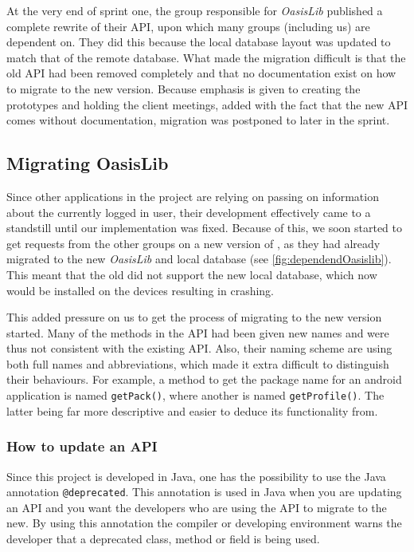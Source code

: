 At the very end of sprint one, the group responsible for \textit{OasisLib} published a complete rewrite of their API, upon which many groups (including us) are dependent on.
They did this because the local database layout was updated to match that of the remote database.
What made the migration difficult is that the old API had been removed completely and that no documentation exist on how to migrate to the new version.
Because emphasis is given to creating the prototypes and holding the client meetings, added with the fact that the new API comes without documentation, migration was postponed to later in the sprint.

\subsection{Migrating OasisLib}\label{sec:oasismigration}

Since other applications in the \giraf project are relying on \launcher passing on information about the currently logged in user, their development effectively came to a standstill until our implementation was fixed.
Because of this, we soon started to get requests from the other groups on a new version of \launcher, as they had already migrated to the new \textit{OasisLib} and local database (see \cref{fig:dependendOasislib}).
This meant that the old \launcher did not support the new local database, which now would be installed on the devices resulting in \launcher crashing.


This added pressure on us to get the process of migrating to the new version started.
Many of the methods in the API had been given new names and were thus not consistent with the existing API.
Also, their naming scheme are using both full names and abbreviations, which made it extra difficult to distinguish their behaviours.
For example, a method to get the package name for an android application is named \lstinline{getPack()}, where another is named \lstinline{getProfile()}.
The latter being far more descriptive and easier to deduce its functionality from.

\subsubsection{How to update an API}
Since this project is developed in Java, one has the possibility to use the Java annotation \lstinline{@deprecated}.
This annotation is used in Java when you are updating an API and you want the developers who are using the API to migrate to the new.
By using this annotation the compiler or developing environment warns the developer that a deprecated class, method or field is being used.

